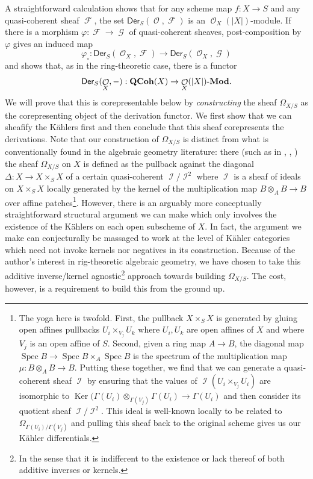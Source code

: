 \documentclass{amsart}
\theoremstyle{definition}
\DeclareMathOperator{\Fscr}{\mathscr{F}}
\DeclareMathOperator{\Gscr}{\mathscr{G}}
\DeclareMathOperator{\Iscr}{\mathscr{I}}
\DeclareMathOperator{\Ocal}{\mathcal{O}}
\DeclareMathOperator{\Spec}{Spec}
\DeclareMathOperator{\QCoh}{\mathbf{QCoh}}
\newcommand{\Mod}[1]{{#1}\textnormal{-}\mathbf{Mod}}
\newcommand{\Kah}[2]{\Omega_{{#1}/{#2}}}
\numberwithin{equation}{subsection}
\begin{document}
A straightforward calculation shows that for any scheme map $f:X \to S$ and any quasi-coherent sheaf $\Fscr$, the set $\mathsf{Der}_S(\Ocal,\Fscr)$ is an $\Ocal_X(\lvert X\rvert)$-module. If there is a morphism $\varphi:\Fscr \to \Gscr$ of quasi-coherent sheaves, post-composition by $\varphi$ gives an induced map
\[
\varphi_{\circ}:\mathsf{Der}_S(\Ocal_X,\Fscr) \to \mathsf{Der}_S(\Ocal_X,\Gscr)
\]
and shows that, as in the ring-theoretic case, there is a functor
\[
\mathsf{Der}_S(\Ocal_X,-):\QCoh(X) \to \Mod{\Ocal_X(\lvert X\rvert)}.
\]
We will prove that this is corepresentable below by \emph{constructing} the sheaf $\Kah{X}{S}$ as the corepresenting object of the derivation functor. We first show that we can sheafify the K{\"a}hlers first and then conclude that this sheaf corepresents the derivations. Note that our construction of $\Kah{X}{S}$ is distinct from what is conventionally found in the algebraic geometry literature: there (such as in \cite{EGA44}, \cite{Hartshorne}, \cite{stacks-project}) the sheaf $\Omega_{X/S}$ on $X$ is defined as the pullback against the diagonal $\Delta:X \to X \times_S X$ of a certain quasi-coherent $\Iscr/\Iscr^2$ where $\Iscr$ is a sheaf of ideals on $X \times_S X$ locally generated by the kernel of the multiplication map $B \otimes_A B \to B$ over affine patches\footnote{The yoga here is twofold. First, the pullback $X \times_S X$ is generated by gluing open affines pullbacks $U_i \times_{V_j} U_k$ where $U_i, U_k$ are open affines of $X$ and where $V_j$ is an open affine of $S$. Second, given a ring map $A \to B$, the diagonal map $\Spec B \to \Spec B \times_A \Spec B$ is the spectrum of the multiplication map $\mu:B \otimes_A B \to B$. Putting these together, we find that we can generate a quasi-coherent sheaf $\Iscr$ by ensuring that the values of $\Iscr(U_i  \times_{V_j} U_i)$ are isomorphic to $\operatorname{Ker}(\Gamma(U_i) \otimes_{\Gamma(V_j)} \Gamma(U_i) \to \Gamma(U_i)$ and then consider its quotient sheaf $\Iscr/\Iscr^2$. This ideal is well-known locally to be related to $\Kah{\Gamma(U_i)}{\Gamma(V_j)}$ and pulling this sheaf back to the original scheme gives us our K{\"a}hler differentials.}. However, there is an arguably more conceptually straightforward structural argument we can make which only involves the existence of the K{\"a}hlers on each open subscheme of $X$. In fact, the argument we make can conjecturally be massaged to work at the level of K{\"a}hler categories which need not invoke kernels nor negatives in its construction. Because of the author's interest in rig-theoretic algebraic geometry, we have chosen to take this additive inverse/kernel agnostic\footnote{In the sense that it is indifferent to the existence or lack thereof of both additive inverses or kernels.} approach towards building $\Kah{X}{S}$. The cost, however, is a requirement to build this from the ground up.
\end{document}
